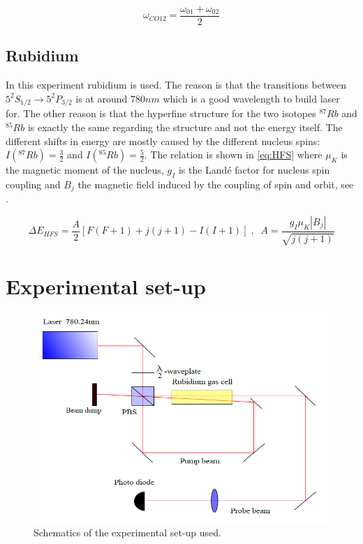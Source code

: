 \documentclass[]{article}
\begin{document}
\begin{equation}
\omega_{CO 12} = \frac{\omega_{01}+\omega_{02}}{2}
\end{equation}

\subsection{Rubidium}
In this experiment rubidium is used. The reason is that the transitions between $5^2S_{1/2} \rightarrow 5^2P_{3/2}$ is at around $780nm$ which is a good wavelength to build laser for. The other reason is that the hyperfine structure for the two isotopes $^{87}Rb$ and $^{85}Rb$ is exactly the same regarding the structure and not the energy itself. The different shifts in energy are mostly caused by the different nucleus spins: $I(^{87}Rb)=\frac{3}{2}$ and $I(^{85}Rb)=\frac{5}{2}$. The relation is shown in \autoref{eq:HFS} where $\mu_K$ is the magnetic moment of the nucleus, $g_I$ is the Landé factor for nucleus spin coupling and $B_j$ the magnetic field induced by the coupling of spin and orbit, see \cite{dem3}.

\begin{equation}
\Delta E_{HFS}=\frac{A}{2} [F(F+1) + j(j+1) - I(I+1)] \;,\;\; A= \frac{g_I \mu_K |B_j|}{\sqrt{j(j+1)}}
\label{eq:HFS}
\end{equation}



\newpage
\section{Experimental set-up}
\begin{figure}[H]
\centering
\includegraphics[width=1\textwidth]{Plots/Setup.png}
\caption{Schematics of the experimental set-up used.}
\label{fig:setup}
\end{figure}
\end{document}
